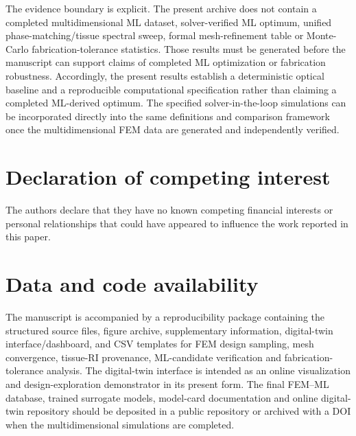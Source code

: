 \documentclass[5p,times,twocolumn]{elsarticle}
\begin{document}
The evidence boundary is explicit. The present archive does not contain a completed multidimensional ML dataset, solver-verified ML optimum, unified phase-matching/tissue spectral sweep, formal mesh-refinement table or Monte-Carlo fabrication-tolerance statistics. Those results must be generated before the manuscript can support claims of completed ML optimization or fabrication robustness. Accordingly, the present results establish a deterministic optical baseline and a reproducible computational specification rather than claiming a completed ML-derived optimum. The specified solver-in-the-loop simulations can be incorporated directly into the same definitions and comparison framework once the multidimensional FEM data are generated and independently verified.

\section*{Declaration of competing interest}
The authors declare that they have no known competing financial interests or personal relationships that could have appeared to influence the work reported in this paper.

\section*{Data and code availability}
The manuscript is accompanied by a reproducibility package containing the structured source files, figure archive, supplementary information, digital-twin interface/dashboard, and CSV templates for FEM design sampling, mesh convergence, tissue-RI provenance, ML-candidate verification and fabrication-tolerance analysis. The digital-twin interface is intended as an online visualization and design-exploration demonstrator in its present form. The final FEM--ML database, trained surrogate models, model-card documentation and online digital-twin repository should be deposited in a public repository or archived with a DOI when the multidimensional simulations are completed.

\end{document}
